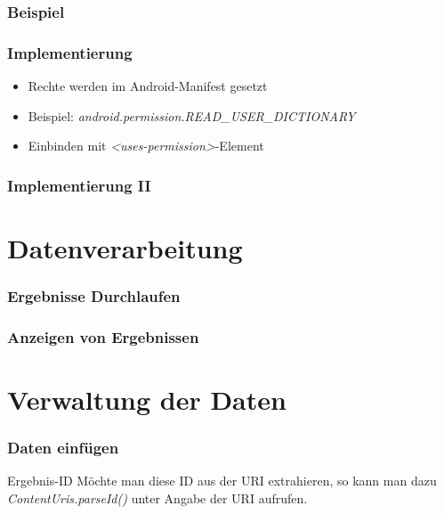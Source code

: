\begin{frame}
   \frametitle{Beispiel}
	
\end{frame}

\begin{frame}
   \frametitle{Implementierung}
   \begin{itemize}
   	\item Rechte werden im Android-Manifest gesetzt
   	\item Beispiel: \emph{android.permission.READ\_USER\_DICTIONARY}
   	\item Einbinden mit \emph{\textless{}uses-permission\textgreater}-Element
   \end{itemize}

	
\end{frame}

\begin{frame}
   \frametitle{Implementierung II}

	
\end{frame}

\section{Datenverarbeitung}
\begin{frame}
   \frametitle{Ergebnisse Durchlaufen}
	
\end{frame}

\begin{frame}
   \frametitle{Anzeigen von Ergebnissen}
	
\end{frame}

\section{Verwaltung der Daten}
\begin{frame}
   \frametitle{Daten einfügen}
	
		
	\begin{alertblock}{Ergebnis-ID}
		Möchte man diese ID aus der URI extrahieren, so kann man dazu 
		\emph{ContentUris.parseId()} unter Angabe der URI aufrufen.
	\end{alertblock}
\end{frame}

